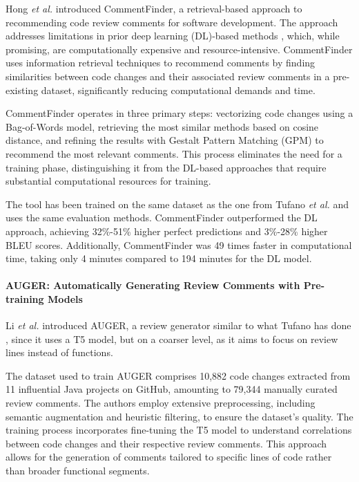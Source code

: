 Hong \emph{et al.} \cite{hong:esecfse2022} introduced CommentFinder, a
retrieval-based approach to recommending code review comments for software
development. The approach addresses limitations in prior deep learning
(DL)-based methods \cite{tufano:icse2022}, which, while promising, are
computationally expensive and resource-intensive. CommentFinder uses
information retrieval techniques to recommend comments by finding similarities
between code changes and their associated review comments in a pre-existing
dataset, significantly reducing computational demands and time.

CommentFinder operates in three primary steps: vectorizing code changes using a
Bag-of-Words model, retrieving the most similar methods based on cosine
distance, and refining the results with Gestalt Pattern Matching (GPM) to
recommend the most relevant comments. This process eliminates the need for a
training phase, distinguishing it from the DL-based approaches that require
substantial computational resources for training.

The tool has been trained on the same dataset as the one from Tufano \textit{et
    al.} \cite{tufano:icse2022} and uses the same evaluation methods. CommentFinder
outperformed the DL approach, achieving 32\%-51\% higher perfect predictions
and 3\%-28\% higher BLEU scores. Additionally, CommentFinder was 49 times
faster in computational time, taking only 4 minutes compared to 194 minutes for
the DL model.

\paragraph{AUGER: Automatically Generating Review Comments with Pre-training Models}

Li \emph{et al.} \cite{li.l:esecfse2022} introduced AUGER, a review generator
similar to what Tufano \etal has done \cite{tufano:icse2022}, since it uses a
T5 model, but on a coarser level, as it aims to focus on review lines instead
of functions.

The dataset used to train AUGER comprises 10,882 code changes extracted from 11
influential Java projects on GitHub, amounting to 79,344 manually curated
review comments. The authors employ extensive preprocessing, including semantic
augmentation and heuristic filtering, to ensure the dataset's quality. The
training process incorporates fine-tuning the T5 model to understand
correlations between code changes and their respective review comments. This
approach allows for the generation of comments tailored to specific lines of
code rather than broader functional segments.

